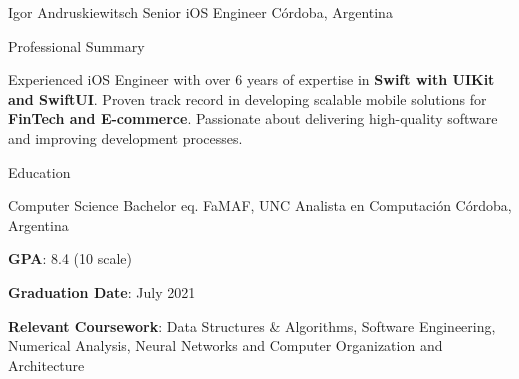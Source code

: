 \documentclass{curriculum}
\begin{document}

\begin{cvheader}

\makeheader
    {Igor Andruskiewitsch}  {}
    {Senior iOS Engineer}    {}
    {C\'ordoba, Argentina}    {}

\end{cvheader}


\begin{cvsection}{Professional Summary}

    \begin{summary}
        Experienced iOS Engineer with over 6 years of expertise in \textbf{Swift with UIKit and SwiftUI}. Proven track record in developing scalable mobile solutions for \textbf{FinTech and E-commerce}. Passionate about delivering high-quality software and improving development processes.
    \end{summary}

\end{cvsection}



\begin{cvsection}{Education}

    \makesectionitemheader
        {Computer Science Bachelor eq.}       {FaMAF, UNC}
        {Analista en Computación}             {C\'ordoba, Argentina}
    \begin{sectionitemlist}
        \item {\textbf{GPA}: 8.4 (10 scale)}
        \item {\textbf{Graduation Date}: July 2021}
        \item {\textbf{Relevant Coursework}: Data Structures \& Algorithms, Software Engineering, Numerical Analysis, Neural Networks and Computer Organization and Architecture}
    \end{sectionitemlist}

\end{cvsection}
\end{document}
